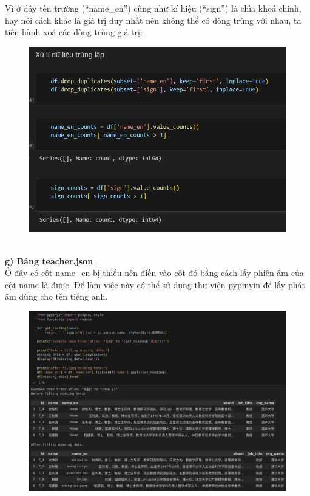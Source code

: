 Vì ở đây tên trường (“name\_en”) cũng như kí hiệu (“sign”) là chìa khoá chính, hay nói cách khác là giá trị duy nhất nên không thể có dòng trùng với nhau, ta tiến hành xoá các dòng trùng giá trị:
\begin{figure}[h]
    \centering
    \includegraphics[width=0.7\linewidth]{figures/51.png}
\end{figure}\\
\textbf{g) Bảng teacher.json}\\
Ở đây có cột name\_en bị thiếu nên điền vào cột đó bằng cách lấy phiên âm của cột name là được. Để làm việc này có thể sử dụng thư viện pypinyin để lấy phát âm dùng cho tên tiếng anh.
\newpage
\begin{figure}
    \centering
    \includegraphics[width=0.8\linewidth]{figures/52.png}
\end{figure}
